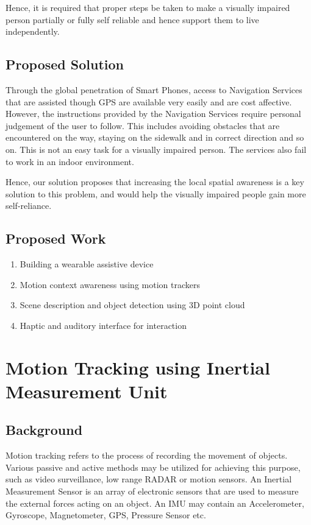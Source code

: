\documentclass[
10pt,           %
a4paper,        %
oneside,        %
headinclude,footinclude, %
]{scrartcl}
\begin{document}
Hence, it is required that proper steps be taken to make a visually impaired person partially or fully self reliable and hence support them to live independently.

\subsection{Proposed Solution}
Through the global penetration of Smart Phones, access to Navigation Services that are assisted though GPS are available very easily and are cost affective. However, the instructions provided by the Navigation Services require personal judgement of the user to follow. This includes avoiding obstacles that are encountered on the way, staying on the sidewalk and in correct direction and so on. This is not an easy task for a visually impaired person. The services also fail to work in an indoor environment.

Hence, our solution proposes that increasing the local spatial awareness is a key solution to this problem, and would help the visually impaired people gain more self-reliance.

\subsection{Proposed Work}

\begin{enumerate}
  \item Building a wearable assistive device
  \item Motion context awareness using motion trackers
  \item Scene description and object detection using 3D point cloud
  \item Haptic and auditory interface for interaction
\end{enumerate}


\newpage
\section{Motion Tracking using Inertial Measurement Unit}

\subsection{Background}
Motion tracking refers to the process of recording the movement of objects. Various passive and active methods may be utilized for achieving this purpose, such as video surveillance, low range RADAR or motion sensors. An Inertial Measurement Sensor is an array of electronic sensors that are used to measure the external forces acting on an object. An IMU may contain an Accelerometer, Gyroscope, Magnetometer, GPS, Pressure Sensor etc.
\end{document}
